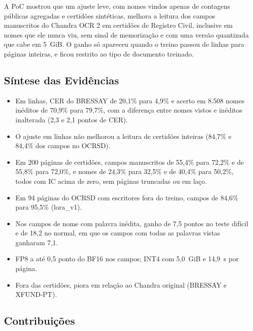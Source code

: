 \documentclass[12pt,a4paper]{article}
\begin{document}
A PoC mostrou que um ajuste leve, com nomes vindos apenas de contagens públicas agregadas e certidões sintéticas, melhora a leitura dos campos manuscritos do Chandra OCR 2 em certidões de Registro Civil, inclusive em nomes que ele nunca viu, sem sinal de memorização e com uma versão quantizada que cabe em 5~GiB. O ganho só apareceu quando o treino passou de linhas para páginas inteiras, e ficou restrito ao tipo de documento treinado.

\subsection{Síntese das Evidências}

\begin{itemize}
    \item Em linhas, CER do BRESSAY de 20,1\% para 4,9\% e acerto em 8.508 nomes inéditos de 70,9\% para 79,7\%, com a diferença entre nomes vistos e inéditos inalterada (2,3 e 2,1 pontos de CER).
    \item O ajuste em linhas não melhorou a leitura de certidões inteiras (84,7\% e 84,4\% dos campos no OCRSD).
    \item Em 200 páginas de certidões, campos manuscritos de 55,4\% para 72,2\% e de 55,8\% para 72,0\%, e nomes de 24,3\% para 32,5\% e de 40,4\% para 50,2\%, todos com IC acima de zero, sem páginas truncadas ou em laço.
    \item Em 94 páginas do OCRSD com escritores fora do treino, campos de 84,6\% para 95,5\% (lora\_v1).
    \item Nos campos de nome com palavra inédita, ganho de 7,5 pontos no teste difícil e de 18,2 no normal, em que os campos com todas as palavras vistas ganharam 7,1.
    \item FP8 a até 0,5 ponto do BF16 nos campos; INT4 com 5,0~GiB e 14,9~s por página.
    \item Fora das certidões, piora em relação ao Chandra original (BRESSAY e XFUND-PT).
\end{itemize}

\subsection{Contribuições}
\end{document}
